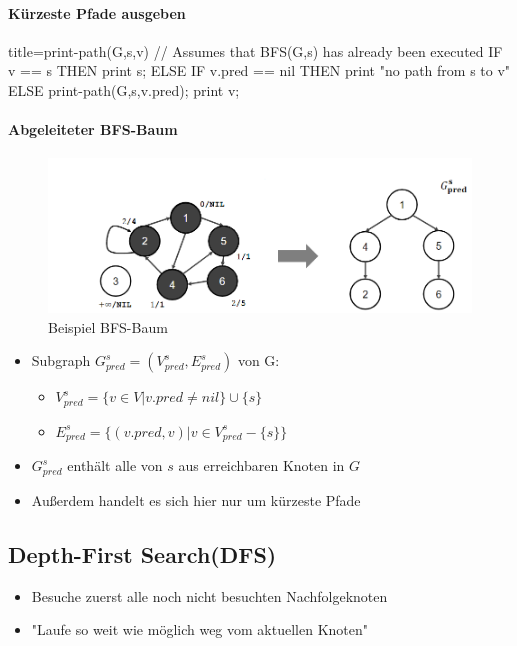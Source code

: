 \documentclass[
    ngerman,
    color=3b,
    dark_mode,
    load_common, %
    summary,
    boxarc,
]{tuda_summary}
\begin{document}
\pagebreak

\paragraph{Kürzeste Pfade ausgeben}\mbox{}
\begin{codeBlock}[autogobble]{title={print-path(G,s,v) // Assumes that BFS(G,s) has already been executed}}
IF v == s THEN
    print s;
ELSE
    IF v.pred == nil THEN
        print "no path from s to v"
    ELSE
        print-path(G,s,v.pred);
        print v;
\end{codeBlock}

\paragraph{Abgeleiteter BFS-Baum}\mbox{}
\begin{figure}[h]
    \centering
    \includegraphics[width=14cm]{pictures/bfsBaum.PNG}
    \caption{Beispiel BFS-Baum}
\end{figure}
\begin{itemize}
    \item Subgraph $G^s_{pred} = (V^s_{pred},E^s_{pred})$ von G:
          \begin{itemize}
              \item $V^s_{pred} = \{v \in V | v.pred \neq nil\} \cup \{s\}$
              \item $E^s_{pred} = \{(v.pred,v) | v \in V^s_{pred} - \{s\}\}$
          \end{itemize}
    \item $G^s_{pred}$ enthält alle von $s$ aus erreichbaren Knoten in $G$
    \item Außerdem handelt es sich hier nur um kürzeste Pfade
\end{itemize}
\clearpage

\subsection{Depth-First Search(DFS)}
\begin{idea}
    \begin{itemize}
        \item Besuche zuerst alle noch nicht besuchten Nachfolgeknoten
        \item \string"Laufe so weit wie möglich weg vom aktuellen Knoten\string"
    \end{itemize}
\end{idea}
\end{document}
